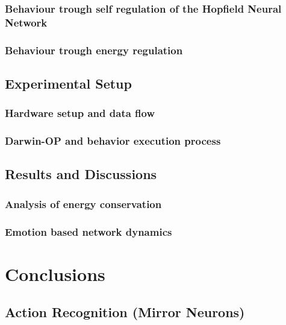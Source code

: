 \documentclass[a4,12pt]{ozu-thesis}
\begin{document}
\subsection{Behaviour trough self regulation of the Hopfield Neural Network}

\subsection{Behaviour trough energy regulation}


\section{Experimental Setup}

\subsection{Hardware setup and data flow}

\subsection{Darwin-OP and behavior execution process}


\section{Results and Discussions}

\subsection{Analysis of energy conservation}

\subsection{Emotion based network dynamics}


\chapter{Conclusions}



\section{Action Recognition (Mirror Neurons)}

\end{document}
